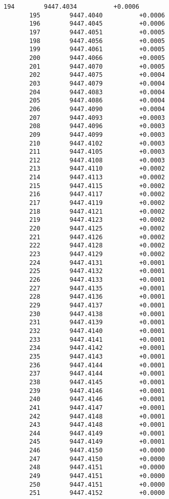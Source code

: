 \documentclass[11pt]{article}
\begin{document}
\begin{Verbatim}[commandchars=\\\{\}]
       194        9447.4034          +0.0006
       195        9447.4040          +0.0006
       196        9447.4045          +0.0006
       197        9447.4051          +0.0005
       198        9447.4056          +0.0005
       199        9447.4061          +0.0005
       200        9447.4066          +0.0005
       201        9447.4070          +0.0005
       202        9447.4075          +0.0004
       203        9447.4079          +0.0004
       204        9447.4083          +0.0004
       205        9447.4086          +0.0004
       206        9447.4090          +0.0004
       207        9447.4093          +0.0003
       208        9447.4096          +0.0003
       209        9447.4099          +0.0003
       210        9447.4102          +0.0003
       211        9447.4105          +0.0003
       212        9447.4108          +0.0003
       213        9447.4110          +0.0002
       214        9447.4113          +0.0002
       215        9447.4115          +0.0002
       216        9447.4117          +0.0002
       217        9447.4119          +0.0002
       218        9447.4121          +0.0002
       219        9447.4123          +0.0002
       220        9447.4125          +0.0002
       221        9447.4126          +0.0002
       222        9447.4128          +0.0002
       223        9447.4129          +0.0002
       224        9447.4131          +0.0001
       225        9447.4132          +0.0001
       226        9447.4133          +0.0001
       227        9447.4135          +0.0001
       228        9447.4136          +0.0001
       229        9447.4137          +0.0001
       230        9447.4138          +0.0001
       231        9447.4139          +0.0001
       232        9447.4140          +0.0001
       233        9447.4141          +0.0001
       234        9447.4142          +0.0001
       235        9447.4143          +0.0001
       236        9447.4144          +0.0001
       237        9447.4144          +0.0001
       238        9447.4145          +0.0001
       239        9447.4146          +0.0001
       240        9447.4146          +0.0001
       241        9447.4147          +0.0001
       242        9447.4148          +0.0001
       243        9447.4148          +0.0001
       244        9447.4149          +0.0001
       245        9447.4149          +0.0001
       246        9447.4150          +0.0000
       247        9447.4150          +0.0000
       248        9447.4151          +0.0000
       249        9447.4151          +0.0000
       250        9447.4151          +0.0000
       251        9447.4152          +0.0000

\end{Verbatim}
\end{document}
